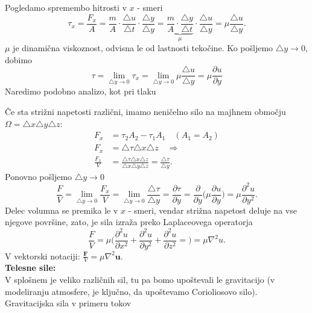 \documentclass[mat2, tisk]{fmfdelo}
\newcommand{\bd}{\textbf}
\begin{document}
Pogledamo spremembo hitrosti v $x$ - smeri
$$
\tau_x = \frac{F_x}{A} = \frac{m}{A} \cdot \frac{\triangle u}{\triangle t}\cdot \frac{\triangle y}{\triangle y} = \underbrace{\frac{m}{A} \cdot\frac{\triangle y}{\triangle t}}_{\mu} \cdot\frac{\triangle u}{\triangle y} = \mu \frac{\triangle u}{\triangle y}.
$$
$\mu$ je dinamična viskoznost, odvisna le od lastnosti tekočine. 
Ko pošljemo $\triangle y \rightarrow 0$, dobimo
$$
\tau = \lim_{\triangle y \rightarrow 0} \tau_x = \lim_{\triangle y \rightarrow 0} \mu\frac{\triangle u}{\triangle y} = \mu\frac{\partial u}{\partial y}
$$
Naredimo podobno analizo, kot pri tlaku \\
\begin{center}
\end{center}
Če sta strižni napetosti različni, imamo neničelno silo na majhnem območju $\Omega = \triangle x \triangle y \triangle z$:
\begin{align*}
F_x &= \tau_2 A_2 - \tau_1 A_1  \quad (A_1 = A_2)\\
F_x &= \triangle \tau \triangle x \triangle z  \quad \Longrightarrow\\
\frac{F_x}{V} &= \frac{\triangle \tau \triangle x \triangle z}{\triangle x \triangle y \triangle z} = \frac{\triangle \tau}{\triangle y}.
\end{align*}
Ponovno pošljemo $\triangle y \rightarrow 0$
$$
\frac{F}{V} = \lim_{\triangle y \rightarrow 0} \frac{F_x}{V} = \lim_{\triangle y \rightarrow 0} \frac{\triangle \tau}{\triangle y} = \frac{\partial \tau}{\partial y} = \frac{\partial}{\partial y} \Big(\mu\frac{\partial u}{\partial y} \Big) = \mu \frac{\partial^2 u}{\partial y^2}.
$$
Delec volumna se premika le v $x$ - smeri, vendar strižna napetost deluje na vse njegove površine, zato, je sila izraža preko Laplaceovega operatorja
$$
\frac{F}{V} = \mu \Big(\frac{\partial^2 u}{\partial x^2} + \frac{\partial^2 u}{\partial y^2} + \frac{\partial^2 u}{\partial z^2} =  \Big) = \mu \nabla^2 u.
$$
V vektorski notaciji: $\frac{\bd{F}}{V} = \mu \nabla^2 \bd{u}$.\\
\textbf{Telesne sile:} \\
V splošnem je veliko različnih sil, tu pa bomo upoštevali le gravitacijo (v modeliranju atmosfere, je ključno, da upoštevamo Corioliosovo silo). Gravitacijska sila v primeru tokov 
\end{document}
